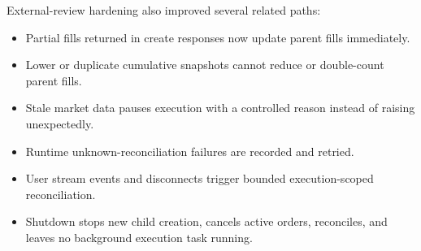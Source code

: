 External-review hardening also improved several related paths:

\begin{itemize}[leftmargin=1.2em]
  \item Partial fills returned in create responses now update parent fills immediately.
  \item Lower or duplicate cumulative snapshots cannot reduce or double-count parent fills.
  \item Stale market data pauses execution with a controlled reason instead of raising unexpectedly.
  \item Runtime unknown-reconciliation failures are recorded and retried.
  \item User stream events and disconnects trigger bounded execution-scoped reconciliation.
  \item Shutdown stops new child creation, cancels active orders, reconciles, and leaves no background execution task running.
\end{itemize}

